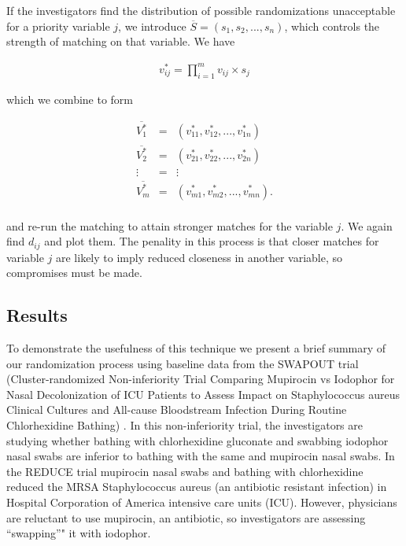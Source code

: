 \documentclass[]{sagej}
\begin{document}
If the investigators find the distribution of possible randomizations
unacceptable for a priority variable \(j\), we introduce
\(\overline{S} = (s_{1}, s_{2},..., s_{n})\), which controls the
strength of matching on that variable. We have

\begin{eqnarray*}
 v_{ij}^* = \prod_{i=1}^{m} v_{ij} \times s_j
\end{eqnarray*}

which we combine to form

\begin{eqnarray*}
 \overline{V_1^*} & = & (v_{11}^*, v_{12}^*,..., v_{1n}^*) \\
 \overline{V_2^*} & = & (v_{21}^*, v_{22}^*,..., v_{2n}^*) \\
 \vdots & = & \vdots\\    
 \overline{V_m^*} & = & (v_{m1}^*, v_{m2}^*,..., v_{mn}^*) .\\
\end{eqnarray*}

and re-run the matching to attain stronger matches for the variable
\(j\). We again find \(d_{ij}\) and plot them. The penality in this
process is that closer matches for variable \(j\) are likely to imply
reduced closeness in another variable, so compromises must be made.

\subsection{Results}\label{results}

To demonstrate the usefulness of this technique we present a brief
summary of our randomization process using baseline data from the
SWAPOUT trial (Cluster-randomized Non-inferiority Trial Comparing
Mupirocin vs Iodophor for Nasal Decolonization of ICU Patients to Assess
Impact on Staphylococcus aureus Clinical Cultures and All-cause
Bloodstream Infection During Routine Chlorhexidine Bathing)
\citep{SOTrial}. In this non-inferiority trial, the investigators are
studying whether bathing with chlorhexidine gluconate and swabbing
iodophor nasal swabs are inferior to bathing with the same and mupirocin
nasal swabs. In the REDUCE trial \citep{huang2013targeted} mupirocin
nasal swabs and bathing with chlorhexidine reduced the MRSA
Staphylococcus aureus (an antibiotic resistant infection) in Hospital
Corporation of America intensive care units (ICU). However, physicians
are reluctant to use mupirocin, an antibiotic, so investigators are
assessing ``swapping''" it with iodophor.
\end{document}
